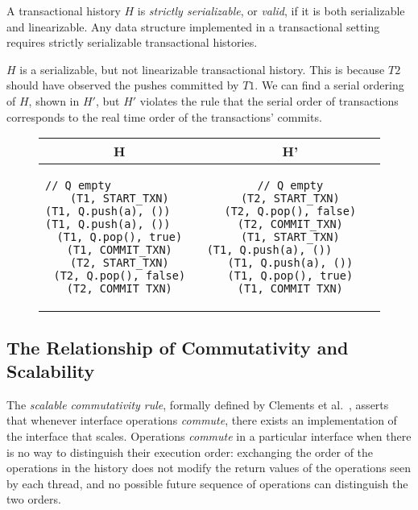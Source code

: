 \begin{defn}
    A transactional history $H$ is \emph{strictly serializable}, or \emph{valid}, if it is both serializable and linearizable. Any data structure implemented in a transactional setting requires strictly serializable transactional histories.
\end{defn}

\begin{eg}
$H$ is a serializable, but not linearizable transactional history. This is because $T2$ should have observed the pushes committed by $T1$. We can find a serial ordering of $H$, shown in $H'$, but $H'$ violates the rule that the serial order of transactions corresponds to the real time order of the transactions' commits.
    
\begin{figure}[H]
    \centering
\singlespacing   
    \begin{tabular}{c|c}
H & H'\\
\hline
\begin{lstlisting}
// Q empty                          
(T1, START_TXN)
(T1, Q.push(a), ())                
(T1, Q.push(a), ())               
(T1, Q.pop(), true)
(T1, COMMIT_TXN)
(T2, START_TXN)
(T2, Q.pop(), false)
(T2, COMMIT_TXN)
\end{lstlisting} & 
\begin{lstlisting}
// Q empty
(T2, START_TXN)
(T2, Q.pop(), false)
(T2, COMMIT_TXN)
(T1, START_TXN)
(T1, Q.push(a), ())                       
(T1, Q.push(a), ())
(T1, Q.pop(), true)
(T1, COMMIT_TXN)
\end{lstlisting}
    \end{tabular}
\end{figure}
\end{eg}

\subsection{The Relationship of Commutativity and Scalability}
\label{com_scale}

The \emph{scalable commutativity rule}, formally defined by Clements et al.~\cite{scrule}, asserts that whenever interface operations \emph{commute}, there exists an implementation of the interface that scales.
Operations \emph{commute} in a particular interface when there is no way to distinguish their execution order: exchanging the order of the operations in the history does not modify the return values of the operations seen by each thread, and no possible future sequence of operations can distinguish the two orders.

